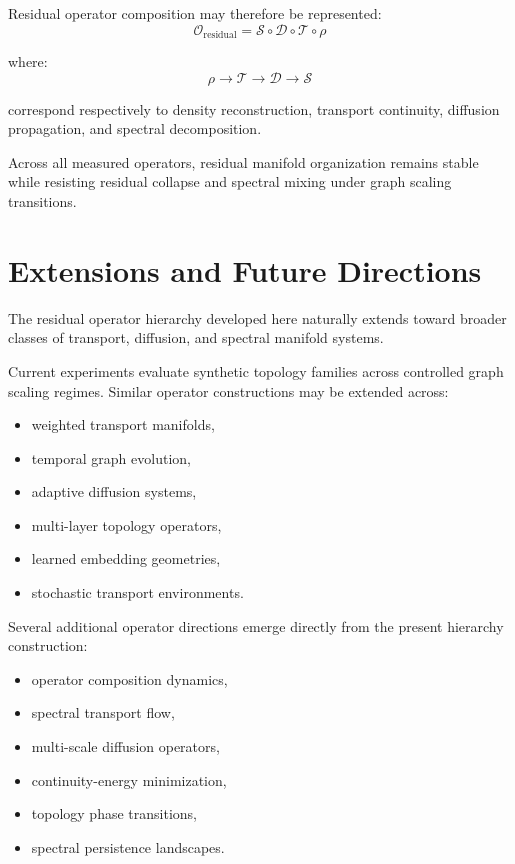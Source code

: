 \documentclass[11pt]{article}
\begin{document}
Residual operator composition may therefore be represented:
\[
\mathcal{O}_{\mathrm{residual}}
=
\mathcal{S}
\circ
\mathcal{D}
\circ
\mathcal{T}
\circ
\rho
\]

where:
\[
\rho
\rightarrow
\mathcal{T}
\rightarrow
\mathcal{D}
\rightarrow
\mathcal{S}
\]

correspond respectively to density reconstruction, transport continuity, diffusion propagation, and spectral decomposition.

Across all measured operators, residual manifold organization remains stable while resisting residual collapse and spectral mixing under graph scaling transitions.

\section{Extensions and Future Directions}

The residual operator hierarchy developed here naturally extends toward broader classes of transport, diffusion, and spectral manifold systems.

Current experiments evaluate synthetic topology families across controlled graph scaling regimes. Similar operator constructions may be extended across:

\begin{itemize}
\item weighted transport manifolds,
\item temporal graph evolution,
\item adaptive diffusion systems,
\item multi-layer topology operators,
\item learned embedding geometries,
\item stochastic transport environments.
\end{itemize}

Several additional operator directions emerge directly from the present hierarchy construction:

\begin{itemize}
\item operator composition dynamics,
\item spectral transport flow,
\item multi-scale diffusion operators,
\item continuity-energy minimization,
\item topology phase transitions,
\item spectral persistence landscapes.
\end{itemize}
\end{document}
